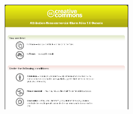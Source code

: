 \begin{figure}
	\centering
	\includegraphics[width=0.50\textwidth]
	{assets/pics/creative_commons.png}
	\label{fig:testGambarBersumber}
\end{figure}
